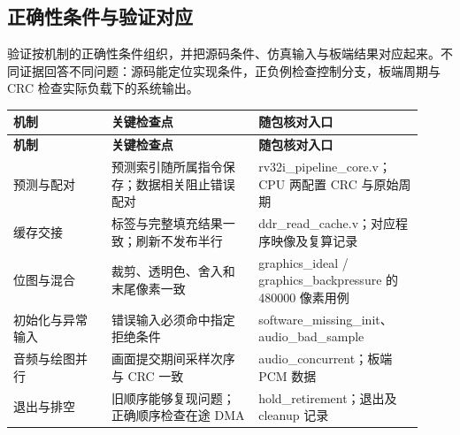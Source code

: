 \documentclass[UTF8,a4paper,12pt]{ctexart}
\begin{document}
\subsection{正确性条件与验证对应}

验证按机制的正确性条件组织，并把源码条件、仿真输入与板端结果对应起来。不同证据回答不同问题：源码能定位实现条件，正负例检查控制分支，板端周期与 CRC 检查实际负载下的系统输出。\par

{\small\setlength{\tabcolsep}{4pt}\renewcommand{\arraystretch}{1.2}

\begin{longtable}{>{\raggedright\arraybackslash}p{0.22\linewidth}>{\raggedright\arraybackslash}p{0.33\linewidth}>{\raggedright\arraybackslash}p{0.37\linewidth}}

\toprule

\textbf{机制} & \textbf{关键检查点} & \textbf{随包核对入口} \\ \midrule

\endfirsthead

\toprule

\textbf{机制} & \textbf{关键检查点} & \textbf{随包核对入口} \\ \midrule

\endhead

预测与配对 & 预测索引随所属指令保存；数据相关阻止错误配对 & rv32i\_pipeline\_core.v；CPU 两配置 CRC 与原始周期 \\

缓存交接 & 标签与完整填充结果一致；刷新不发布半行 & ddr\_read\_cache.v；对应程序映像及复算记录 \\

位图与混合 & 裁剪、透明色、舍入和末尾像素一致 & graphics\_ideal / graphics\_backpressure 的 480000 像素用例 \\

初始化与异常输入 & 错误输入必须命中指定拒绝条件 & software\_missing\_init、audio\_bad\_sample \\

音频与绘图并行 & 画面提交期间采样次序与 CRC 一致 & audio\_concurrent；板端 PCM 数据 \\

退出与排空 & 旧顺序能够复现问题；正确顺序检查在途 DMA & hold\_retirement；退出及 cleanup 记录 \\

\bottomrule

\end{longtable}

}
\end{document}
